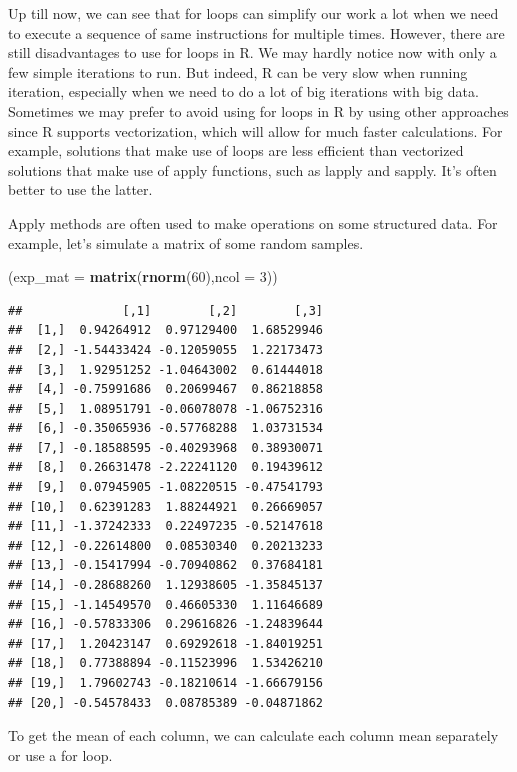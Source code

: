 \documentclass[12pt,]{krantz}
\newenvironment{Shaded}{\begin{snugshade}}{\end{snugshade}}
\newcommand{\KeywordTok}[1]{\textcolor[rgb]{0.27,0.27,0.27}{\textbf{#1}}}
\newcommand{\DataTypeTok}[1]{\textcolor[rgb]{0.27,0.27,0.27}{#1}}
\newcommand{\DecValTok}[1]{\textcolor[rgb]{0.06,0.06,0.06}{#1}}
\newcommand{\NormalTok}[1]{#1}
\begin{document}
Up till now, we can see that for loops can simplify our work a lot when
we need to execute a sequence of same instructions for multiple times.
However, there are still disadvantages to use for loops in R. We may
hardly notice now with only a few simple iterations to run. But indeed,
R can be very slow when running iteration, especially when we need to do
a lot of big iterations with big data. Sometimes we may prefer to avoid
using for loops in R by using other approaches since R supports
vectorization, which will allow for much faster calculations. For
example, solutions that make use of loops are less efficient than
vectorized solutions that make use of apply functions, such as lapply
and sapply. It's often better to use the latter.

Apply methods are often used to make operations on some structured data.
For example, let's simulate a matrix of some random samples.

\begin{Shaded}
\begin{Highlighting}[]
\NormalTok{(}\DataTypeTok{exp_mat =} \KeywordTok{matrix}\NormalTok{(}\KeywordTok{rnorm}\NormalTok{(}\DecValTok{60}\NormalTok{),}\DataTypeTok{ncol =} \DecValTok{3}\NormalTok{))}
\end{Highlighting}
\end{Shaded}

\begin{verbatim}
##              [,1]        [,2]        [,3]
##  [1,]  0.94264912  0.97129400  1.68529946
##  [2,] -1.54433424 -0.12059055  1.22173473
##  [3,]  1.92951252 -1.04643002  0.61444018
##  [4,] -0.75991686  0.20699467  0.86218858
##  [5,]  1.08951791 -0.06078078 -1.06752316
##  [6,] -0.35065936 -0.57768288  1.03731534
##  [7,] -0.18588595 -0.40293968  0.38930071
##  [8,]  0.26631478 -2.22241120  0.19439612
##  [9,]  0.07945905 -1.08220515 -0.47541793
## [10,]  0.62391283  1.88244921  0.26669057
## [11,] -1.37242333  0.22497235 -0.52147618
## [12,] -0.22614800  0.08530340  0.20213233
## [13,] -0.15417994 -0.70940862  0.37684181
## [14,] -0.28688260  1.12938605 -1.35845137
## [15,] -1.14549570  0.46605330  1.11646689
## [16,] -0.57833306  0.29616826 -1.24839644
## [17,]  1.20423147  0.69292618 -1.84019251
## [18,]  0.77388894 -0.11523996  1.53426210
## [19,]  1.79602743 -0.18210614 -1.66679156
## [20,] -0.54578433  0.08785389 -0.04871862
\end{verbatim}

To get the mean of each column, we can calculate each column mean
separately or use a for loop.
\end{document}
